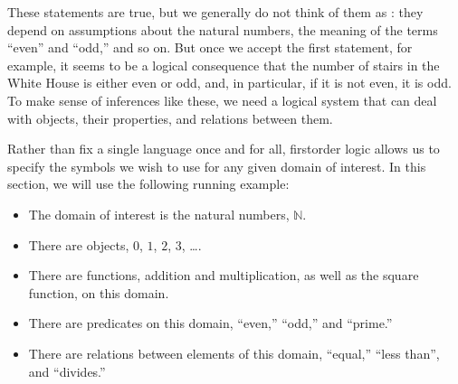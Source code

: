 \documentclass[letterpaper,10pt,english]{sphinxmanual}
\begin{document}
\sphinxAtStartPar
These statements are true, but we generally do not think of them as : they depend on assumptions about the natural numbers, the meaning of the terms “even” and “odd,” and so on. But once we accept the first statement, for example, it seems to be a logical consequence that the number of stairs in the White House is either even or odd, and, in particular, if it is not even, it is odd. To make sense of inferences like these, we need a logical system that can deal with objects, their properties, and relations between them.

\sphinxAtStartPar
Rather than fix a single language once and for all, first\sphinxhyphen{}order logic allows us to specify the symbols we wish to use for any given domain of interest. In this section, we will use the following running example:
\begin{itemize}
\item {} 
\sphinxAtStartPar
The domain of interest is the natural numbers, \(\mathbb{N}\).

\item {} 
\sphinxAtStartPar
There are objects, \(0\), \(1\), \(2\), \(3\), ….

\item {} 
\sphinxAtStartPar
There are functions, addition and multiplication, as well as the square function, on this domain.

\item {} 
\sphinxAtStartPar
There are predicates on this domain, “even,” “odd,” and “prime.”

\item {} 
\sphinxAtStartPar
There are relations between elements of this domain, “equal,” “less than”, and “divides.”

\end{itemize}
\end{document}
